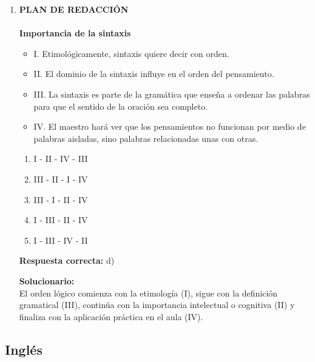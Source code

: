 \begin{enumerate}
	\item \textbf{PLAN DE REDACCIÓN}\\
	\\
	\textbf{Importancia de la sintaxis}
	\begin{itemize}[label={}]
		\item I. Etimológicamente, sintaxis quiere decir con orden.
		\item II. El dominio de la sintaxis influye en el orden del pensamiento.
		\item III. La sintaxis es parte de la gramática que enseña a ordenar las palabras para que el sentido de la oración sea completo.
		\item IV. El maestro hará ver que los pensamientos no funcionan por medio de palabras aisladas, sino palabras relacionadas unas con otras.
	\end{itemize}
	\begin{enumerate}[label=\alph*)]
		\item I - II - IV - III
		\item III - II - I - IV
		\item III - I - II - IV
		\item I - III - II - IV
		\item I - III - IV - II
	\end{enumerate}
	\textbf{Respuesta correcta:} d)
	
	\vspace{2mm}
	\textbf{Solucionario:}\\
	El orden lógico comienza con la etimología (I), sigue con la definición gramatical (III), continúa con la importancia intelectual o cognitiva (II) y finaliza con la aplicación práctica en el aula (IV).
	
	\vspace{6mm}
\end{enumerate}


\subsection*{Inglés}

